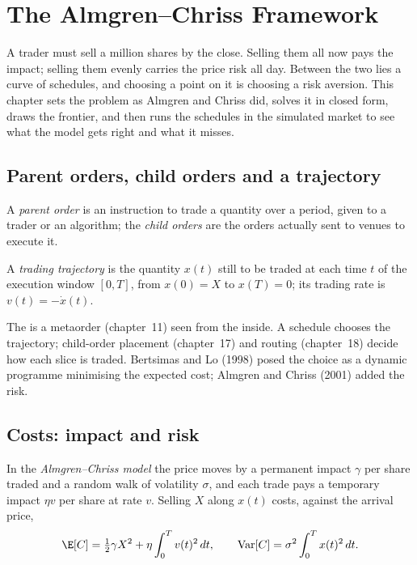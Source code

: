 \chapter{The Almgren--Chriss Framework}\label{ch:mx:the-almgren-chriss-framework}

A trader must sell a million shares by the close. Selling them all now pays the impact; selling them evenly carries the price risk all day. Between
the two lies a curve of schedules, and choosing a point on it is choosing a risk aversion. This chapter sets the problem as Almgren and Chriss did,
solves it in closed form, draws the frontier, and then runs the schedules in the simulated market to see what the model gets right and what it misses.

\section{Parent orders, child orders and a trajectory}

\begin{definition}\label{def:mx:the-almgren-chriss-framework:parent}
A \emph{parent order} is an instruction to trade a quantity over a period, given to a trader or an algorithm; the
\emph{child orders} are the orders actually sent to venues to execute it.
\end{definition}

\begin{definition}\label{def:mx:the-almgren-chriss-framework:trajectory}
A \emph{trading trajectory} is the quantity $x(t)$ still to be traded at each time $t$ of the execution window $[0,T]$, from
$x(0)=X$ to $x(T)=0$; its trading rate is $v(t)=-\dot x(t)$.
\end{definition}

The  is a metaorder (chapter~11) seen from the inside. A schedule chooses the trajectory; child-order placement (chapter~17) and routing
(chapter~18) decide how each slice is traded. Bertsimas and Lo (1998) posed the choice as a dynamic programme minimising the expected cost; Almgren and
Chriss (2001) added the risk.

\section{Costs: impact and risk}

\begin{definition}\label{def:mx:the-almgren-chriss-framework:ac}
In the \emph{Almgren--Chriss model} the price moves by a permanent impact $\gamma$ per share traded and a random walk of
volatility $\sigma$, and each trade pays a temporary impact $\eta v$ per share at rate $v$. Selling $X$ along $x(t)$ costs, against the arrival price,
\[
\E[C]=\tfrac12\gamma X^2+\eta\int_0^Tv(t)^2\,dt,\qquad \operatorname{Var}[C]=\sigma^2\int_0^Tx(t)^2\,dt.
\]
\end{definition}

